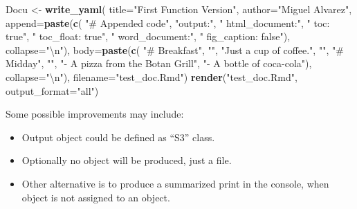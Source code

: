 \documentclass[
]{article}
\newenvironment{Shaded}{\begin{snugshade}}{\end{snugshade}}
\newcommand{\CharTok}[1]{\textcolor[rgb]{0.31,0.60,0.02}{#1}}
\newcommand{\DataTypeTok}[1]{\textcolor[rgb]{0.13,0.29,0.53}{#1}}
\newcommand{\KeywordTok}[1]{\textcolor[rgb]{0.13,0.29,0.53}{\textbf{#1}}}
\newcommand{\NormalTok}[1]{#1}
\newcommand{\StringTok}[1]{\textcolor[rgb]{0.31,0.60,0.02}{#1}}
\providecommand{\tightlist}{%
  \setlength{\itemsep}{0pt}\setlength{\parskip}{0pt}}
\begin{document}
\begin{Shaded}
\begin{Highlighting}[]
\NormalTok{Docu \textless{}{-}}\StringTok{ }\KeywordTok{write\_yaml}\NormalTok{(}
        \DataTypeTok{title=}\StringTok{"First Function Version"}\NormalTok{,}
        \DataTypeTok{author=}\StringTok{"Miguel Alvarez"}\NormalTok{,}
        \DataTypeTok{append=}\KeywordTok{paste}\NormalTok{(}\KeywordTok{c}\NormalTok{(}
                        \StringTok{"\# Appended code"}\NormalTok{,}
                        \StringTok{"output:"}\NormalTok{,}
                        \StringTok{"  html\_document:"}\NormalTok{,}
                        \StringTok{"    toc: true"}\NormalTok{,}
                        \StringTok{"    toc\_float: true"}\NormalTok{,}
                        \StringTok{"  word\_document:"}\NormalTok{,}
                        \StringTok{"    fig\_caption: false"}\NormalTok{),}
                \DataTypeTok{collapse=}\StringTok{"}\CharTok{\textbackslash{}n}\StringTok{"}\NormalTok{),}
        \DataTypeTok{body=}\KeywordTok{paste}\NormalTok{(}\KeywordTok{c}\NormalTok{(}
                        \StringTok{"\# Breakfast"}\NormalTok{,}
                        \StringTok{""}\NormalTok{,}
                        \StringTok{"Just a cup of coffee."}\NormalTok{,}
                        \StringTok{""}\NormalTok{,}
                        \StringTok{"\# Midday"}\NormalTok{,}
                        \StringTok{""}\NormalTok{,}
                        \StringTok{"{-} A pizza from the Botan Grill"}\NormalTok{,}
                        \StringTok{"{-} A bottle of coca{-}cola"}\NormalTok{),}
                \DataTypeTok{collapse=}\StringTok{"}\CharTok{\textbackslash{}n}\StringTok{"}\NormalTok{),}
        \DataTypeTok{filename=}\StringTok{"test\_doc.Rmd"}\NormalTok{)}
\KeywordTok{render}\NormalTok{(}\StringTok{"test\_doc.Rmd"}\NormalTok{, }\DataTypeTok{output\_format=}\StringTok{"all"}\NormalTok{)}
\end{Highlighting}
\end{Shaded}

Some possible improvements may include:

\begin{itemize}
\tightlist
\item
  Output object could be defined as ``S3'' class.
\item
  Optionally no object will be produced, just a file.
\item
  Other alternative is to produce a summarized print in the console,
  when object is not assigned to an object.
\end{itemize}
\end{document}
